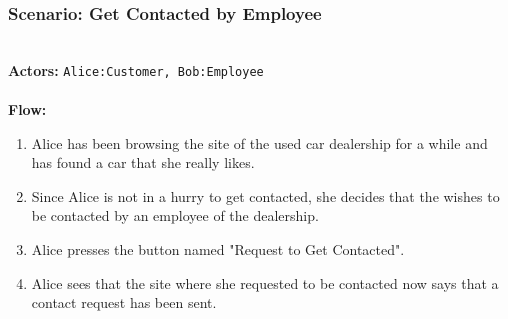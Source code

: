 \subsubsection{Scenario: Get Contacted by Employee}
\HRule \\[0.4cm]
\textbf{Actors:} \texttt{Alice:Customer, Bob:Employee}\\
\HRule \\[0.4cm]
\textbf{Flow:} \\
\begin{enumerate}
    \item Alice has been browsing the site of the used car dealership for a while and has found a car that she really likes.
    \item Since Alice is not in a hurry to get contacted, she decides that the wishes to be contacted by an employee of the dealership. 
    \item Alice presses the button named "Request to Get Contacted".
    \item Alice sees that the site where she requested to be contacted now says that a contact request has been sent.
\end{enumerate}
\HRule \\[0.4cm]
